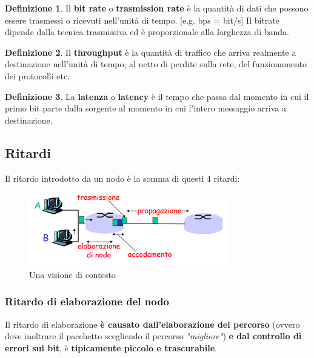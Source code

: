 \documentclass[11pt,a4paper]{article}
\theoremstyle{definition}
\newtheorem{definition}{Definizione}[section]
\begin{document}
\theoremstyle{definition}
\begin{definition}
	Il \textbf{bit rate} o \textbf{trasmission rate} è la quantità di dati che possono essere trasmessi o ricevuti nell'unità di tempo. [e.g. bps = bit/s]\newline
	Il bitrate dipende dalla tecnica trasmissiva ed è proporzionale alla larghezza di banda.
\end{definition}

\theoremstyle{definition}
\begin{definition}
	Il \textbf{throughput} è la quantità di traffico che arriva realmente a destinazione nell'unità di tempo, al netto di perdite sulla rete,
	del funzionamento dei protocolli etc.
\end{definition}

\theoremstyle{definition}
\begin{definition}
	La \textbf{latenza} o \textbf{latency} è il tempo che passa dal momento in cui il primo bit parte dalla sorgente al momento in cui l'intero messaggio arriva a destinazione. \newline

\end{definition}
\newpage

\subsection{Ritardi}
Il ritardo introdotto da un nodo è la somma di questi 4 ritardi:
\begin{figure}[!h]
	\includegraphics[scale=0.7]{Immagini/Ritardi.png}
	\centering
	\caption{Una visione di contesto}
\end{figure}

\subsubsection{Ritardo di elaborazione del nodo}
Il ritardo di elaborazione \textbf{è causato dall'elaborazione del percorso} (ovvero dove inoltrare il pacchetto scegliendo il percorso \textit{"migliore"}) \textbf{e dal controllo di errori sui bit}, è \textbf{tipicamente piccolo e trascurabile}.
\end{document}
